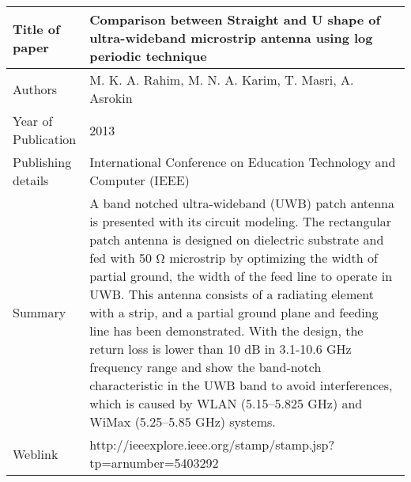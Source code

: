 \documentclass{article}
\begin{document}
\begin{table}
  \centering
	\begin{tabular}{ |l|p{11cm}| }
			\hline
		     Title of paper & Comparison between Straight and U shape of ultra-wideband microstrip antenna using log periodic technique  \\
		     \hline
			 Authors & M. K. A. Rahim, M. N. A. Karim, T. Masri, A. Asrokin \\
			\hline
			 Year of Publication & 2013 \\
			\hline
			 Publishing details & International Conference on Education Technology and Computer (IEEE) \\ \hline
			 Summary & A band notched ultra-wideband (UWB) patch antenna is presented with its circuit modeling. The rectangular patch antenna is designed on dielectric substrate and fed with 50 Ω microstrip by optimizing the width of partial ground, the width of the feed line to operate in UWB. This antenna consists of a radiating element with a strip, and a partial ground plane and feeding line has been demonstrated. With the design, the return loss is lower than 10 dB in 3.1-10.6 GHz frequency range and show the band-notch characteristic in the UWB band to avoid interferences, which is caused by WLAN (5.15–5.825 GHz) and WiMax (5.25–5.85 GHz) systems. \\
			\hline
			 Weblink & http://ieeexplore.ieee.org/stamp/stamp.jsp?tp=arnumber=5403292 \\
			 \hline			 
	\end{tabular}		

\end{table}
\end{document}
